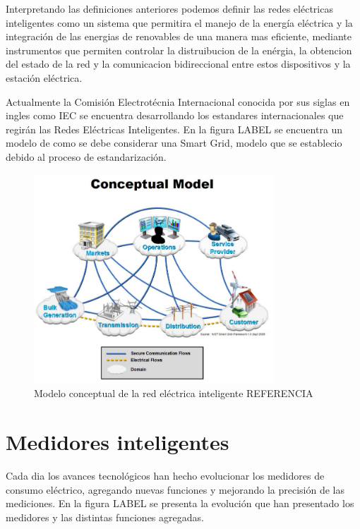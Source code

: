   \par Interpretando las definiciones anteriores podemos definir las redes eléctricas inteligentes como un sistema que permitira el manejo de la energía eléctrica y la integración de las energias de renovables de una manera mas eficiente, mediante instrumentos que permiten controlar la distruibucion de la enérgia, la obtencion del estado de la red y la comunicacion bidireccional entre estos dispositivos y la estación eléctrica.

  \par Actualmente la Comisión Electrotécnia Internacional conocida por sus siglas en ingles como IEC se encuentra desarrollando los estandares internacionales que regirán las Redes Eléctricas Inteligentes. En la figura LABEL se encuentra un modelo de como se debe considerar una Smart Grid, modelo que se establecio debido al proceso de estandarización.

  \begin{figure}[H]
    \centering
    \includegraphics[width=0.8\textwidth]{../Imagenes/modelo_SG.png}
    \caption{Modelo conceptual de la red eléctrica inteligente REFERENCIA}
    \label{fig:model_SG}
  \end{figure}

\section{Medidores inteligentes}
  \par

  \par Cada dia los avances tecnológicos han hecho evolucionar los medidores de consumo eléctrico, agregando nuevas funciones y mejorando la precisión de las mediciones. En la figura LABEL se presenta la evolución que han presentado los medidores y las distintas funciones agregadas.

